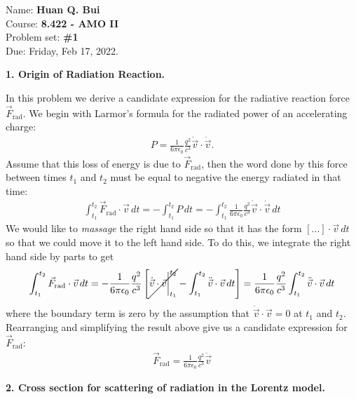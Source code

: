 \documentclass{article}
\theoremstyle{definition}
\newcommand{\f}[2]{\frac{#1}{#2}}
\newcommand{\lb}{\left[}
\newcommand{\rb}{\right]}
\begin{document}
\begin{framed}
\noindent Name: \textbf{Huan Q. Bui}\\
Course: \textbf{8.422 - AMO II}\\
Problem set: \textbf{\#1}\\
Due: Friday, Feb 17, 2022.
\end{framed}
	
	
\noindent \textbf{1. Origin of Radiation Reaction.} 

\noindent In this problem we derive a candidate expression for the radiative reaction force $\vec{F}_\text{rad}$. We begin with Larmor's formula for the radiated power of an accelerating charge:
\begin{align*}
P = \f{1}{6\pi \epsilon_0} \f{q^2}{c^3} \dot{\vec{v}} \cdot \dot{ \vec{v}}.
\end{align*}
Assume that this loss of energy is due to $\vec{F}_\text{rad}$, then the word done by this force between times $t_1$ and $t_2$ must be equal to negative the energy radiated in that time:
\begin{align*}
\int_{t_1}^{t_2} \vec{F}_\text{rad}\cdot \vec{v} \,dt = - \int_{t_1}^{t_2} P \,dt = -\int_{t_1}^{t_2} \f{1}{6\pi \epsilon_0} \f{q^2}{c^3} \dot{\vec{v}} \cdot \dot{\vec{v}} \,dt
\end{align*}
We would like to \textit{massage} the right hand side so that it has the form $[...] \cdot \vec{v}\,dt$ so that we could move it to the left hand side. To do this, we integrate the right hand side by parts to get
\begin{align*}
\int_{t_1}^{t_2} \vec{F}_\text{rad}\cdot \vec{v} \,dt = -  \f{1}{6\pi \epsilon_0} \f{q^2}{c^3} 
\lb \cancel{  \dot{\vec{v}} \cdot \vec{v}\bigg\vert_{t_1}^{t_2}}  -    \int_{t_1}^{t_2}\ddot{\vec{v}} \cdot {\vec{v}} \,dt \rb =   \f{1}{6\pi \epsilon_0} \f{q^2}{c^3} \int_{t_1}^{t_2} \ddot{\vec{v}} \cdot \vec{v}\,dt
\end{align*}
where the boundary term is zero by the assumption that $\dot{\vec{v}}\cdot \vec{v} = 0$ at $t_1$ and $t_2$. Rearranging and simplifying the result above give us a candidate expression for $\vec{F}_\text{rad}$:
\begin{align*}
\boxed{\vec{F}_\text{rad}  =  \f{1}{6\pi\epsilon_0} \frac{q^2}{c^3}  \ddot{\vec{v}} }
\end{align*}



\noindent \textbf{2. Cross section for scattering of radiation in the Lorentz model.}
\end{document}
